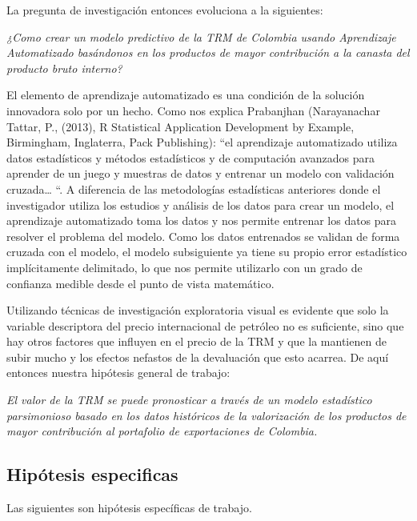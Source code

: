 \documentclass[letterpaper, spanish, 11pt]{report}
\begin{document}
La pregunta de investigación entonces evoluciona a la siguientes:

\emph{¿Como crear un modelo predictivo de la TRM de Colombia usando Aprendizaje Automatizado basándonos en los productos de mayor contribución a la canasta del producto bruto interno?}

El elemento de aprendizaje automatizado es una condición de la solución innovadora solo por un hecho. Como nos explica Prabanjhan (Narayanachar Tattar, P., (2013), R Statistical Application Development by Example, Birmingham, Inglaterra, Pack Publishing): “el aprendizaje automatizado utiliza datos estadísticos y métodos estadísticos y de computación avanzados para aprender de un juego y muestras de datos y entrenar un modelo con validación cruzada… “. A diferencia de las metodologías estadísticas anteriores donde el investigador utiliza los estudios y análisis de los datos para crear un modelo, el aprendizaje automatizado toma los datos y nos permite entrenar los datos para resolver el problema del modelo. Como los datos entrenados se validan de forma cruzada con el modelo, el modelo subsiguiente ya tiene su propio error estadístico implícitamente delimitado, lo que nos permite utilizarlo con un grado de confianza medible desde el punto de vista matemático.

Utilizando técnicas de investigación exploratoria visual es evidente que solo la variable descriptora del precio internacional de petróleo no es suficiente, sino que hay otros factores que influyen en el precio de la TRM y que la mantienen de subir mucho y los efectos nefastos de la devaluación que esto acarrea. De aquí entonces nuestra hipótesis general de trabajo:

\emph{El valor de la TRM se puede pronosticar a través de un modelo estadístico parsimonioso basado en los datos históricos de la valorización de los productos de mayor contribución al portafolio de exportaciones de Colombia.}

\subsection{Hipótesis especificas}
Las siguientes son hipótesis específicas de trabajo.
\end{document}
